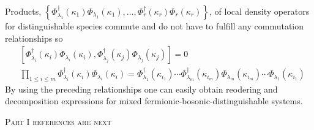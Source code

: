 \documentclass[aps,preprint]{revtex4}%
\begin{document}
Products, $\left\{  \Phi_{\mathcal{\lambda}_{1}}^{\dagger}(\kappa_{1}%
)\Phi_{\mathcal{\lambda}_{1}}(\kappa_{1}),\ldots,\Phi_{r}^{\dagger}(\kappa
_{r})\Phi_{r}(\kappa_{r})\right\}  $, of local density operators for
distinguishable species commute and do not have to fulfill any commutation
relationships so
\begin{align}
&  \left[  \Phi_{\mathcal{\lambda}_{i}}^{\dagger}(\kappa_{i})\Phi
_{\mathcal{\lambda}_{i}}(\kappa_{i}),\Phi_{\mathcal{\lambda}_{j}}^{\dagger
}(\kappa_{j})\Phi_{\mathcal{\lambda}_{j}}(\kappa_{j})\right]  =0\nonumber\\
&  \prod_{1\leq i\leq m}\Phi_{\mathcal{\lambda}_{i}}^{\dagger}(\kappa_{i}%
)\Phi_{\mathcal{\lambda}_{i}}(\kappa_{i})=\Phi_{\mathcal{\lambda}_{1}%
}^{\dagger}(\kappa_{i_{1}})\cdots\Phi_{\mathcal{\lambda}_{m}}^{\dagger}%
(\kappa_{i_{m}})\Phi_{\mathcal{\lambda}_{m}}(\kappa_{i_{m}})\cdots
\Phi_{\mathcal{\lambda}_{1}}(\kappa_{i_{1}})
\end{align}
By using the preceding relationships one can easily obtain reodering and
decomposition expressions for mixed fermionic-bosonic-distinguishable systems.

\textsc{Part I references are next}
\end{document}
